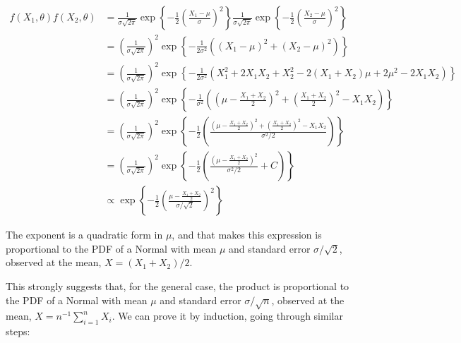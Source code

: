\begin{align} 
f(X_1, \theta) f(X_2, \theta) &= 
\frac{1}{\sigma \sqrt{2 \pi}} \exp \left\{-\frac{1}{2} \left(\frac{X_1 - \mu}{\sigma} \right)^2 \right\}
\frac{1}{\sigma \sqrt{2 \pi}} \exp \left\{-\frac{1}{2} \left(\frac{X_2 - \mu}{\sigma} \right)^2 \right\} \\
&= \left( \frac{1}{\sigma \sqrt{2 \pi}} \right)^2 \exp \left\{-\frac{1}{2\sigma^2} \left((X_1 - \mu)^2 + (X_2 - \mu)^2 \right) \right\} \\
&= \left( \frac{1}{\sigma \sqrt{2 \pi}} \right)^2 \exp \left\{-\frac{1}{2\sigma^2} \left(
X_1^2 + 2 X_1 X_2 + X_2^2 - 2 (X_1 + X_2)\mu + 2\mu^2 - 2 X_1 X_2
\right) \right\} \\
&= \left( \frac{1}{\sigma \sqrt{2 \pi}} \right)^2 \exp \left\{-\frac{1}{\sigma^2}\left(
\left(\mu - \frac{X_1 + X_2}{2}\right)^2 + \left(\frac{X_1 + X_2}{2}\right)^2 - X_1 X_2
\right) \right\} \\
&= \left( \frac{1}{\sigma \sqrt{2 \pi}} \right)^2 \exp \left\{-\frac{1}{2} \left(
\frac{\left(\mu - \frac{X_1 + X_2}{2}\right)^2 + \left(\frac{X_1 + X_2}{2}\right)^2 - X_1 X_2}{\sigma^2 / 2}
\right) \right\} \\
&= \left( \frac{1}{\sigma \sqrt{2 \pi}} \right)^2 \exp \left\{-\frac{1}{2} \left(
\frac{\left(\mu - \frac{X_1 + X_2}{2}\right)^2}{\sigma^2 / 2} + C
\right) \right\} \\
&\propto \exp \left\{-\frac{1}{2}
\left(\frac{\mu - \frac{X_1 + X_2}{2}}{\sigma / \sqrt{2}}\right)^2
\right\}
\end{align}

The exponent is a quadratic form in \(\mu\), and that makes this
expression is proportional to the PDF of a Normal with mean \(\mu\) and
standard error \(\sigma / \sqrt{2}\), observed at the mean,
\(X = (X_1 + X_2)/2\).

This strongly suggests that, for the general case, the product is
proportional to the PDF of a Normal with mean \(\mu\) and standard error
\(\sigma / \sqrt{n}\), observed at the mean,
\(X = n^{-1} \sum_{i=1}^n X_i\). We can prove it by induction, going
through similar steps:

